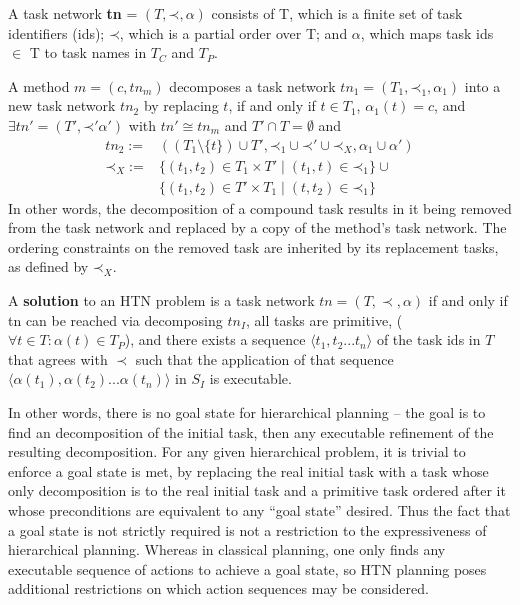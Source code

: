 \documentclass[letterpaper]{article}
\newcommand{\singlePrec} {\ensuremath{\mathit{ \mathord{\prec} }}}
\begin{document}
A task network \textbf{tn} = $(T, \singlePrec, \alpha)$ consists of
T, which is a finite set of task identifiers (ids); 
$\singlePrec$, which is a partial order over T; and
$\alpha$, which maps task ids $\in$ T to task names in $T_C$ and $T_P$. 

A method $m = (c, tn_m)$ decomposes a task network $tn_1 = (T_1, \singlePrec_1, \alpha_1)$ into
a new task network $tn_2$ by replacing $t$, if and only if $t \in T_1$, $\alpha_1(t) = c$, and $\exists tn' = (T', \singlePrec' \alpha')$ with $tn' \cong tn_m$ and $T' \cap T = \emptyset$ and
\begin{align}
tn_2 :=     &((T_1 \setminus \{t\}) \cup T',    \singlePrec_1 \cup \singlePrec' \cup \singlePrec_X,        \alpha_1 \cup \alpha') \\
\singlePrec_X :=  &\{(t_1, t_2) \in T_1 \times T'  \mid  (t_1,t) \in \singlePrec_1 \} \cup \\
&\{(t_1, t_2) \in T' \times T_1 \mid (t, t_2) \in \singlePrec_1 \}  
\end{align}
In other words, the decomposition of a compound task results in it being removed from the task network and replaced by a copy of the method’s task network. The ordering constraints
on the removed task are inherited by its replacement tasks, as defined by $\singlePrec_X$. 

A \textbf{solution} to an HTN problem is a task network $tn = (T, \prec, \alpha)$ if and only if
tn can be reached via decomposing $tn_I$, all tasks are primitive, ($\forall t \in T: \alpha(t) \in T_P$), and there exists a sequence $\langle t_1, t_2 ... t_n \rangle$ of the task ids in $T$ that agrees with $\prec$ such that the application of that sequence $\langle \alpha(t_1), \alpha(t_2) ... \alpha(t_n) \rangle$ in $S_I$ is executable.

In other words, there is no goal state for hierarchical planning -- the goal is to find an decomposition of the initial task, then any executable refinement of the resulting decomposition. For any given hierarchical problem, it is trivial to enforce a goal state is met, by replacing the real initial task with a task whose only decomposition is to the real initial task and a primitive task ordered after it whose preconditions are equivalent to any \enquote{goal state} desired. Thus the fact that a goal state is not strictly required is not a restriction to the expressiveness of hierarchical planning. Whereas in classical planning, one only finds any executable sequence of actions to achieve a goal state, so HTN planning poses additional restrictions on which action sequences may be considered.
\end{document}
